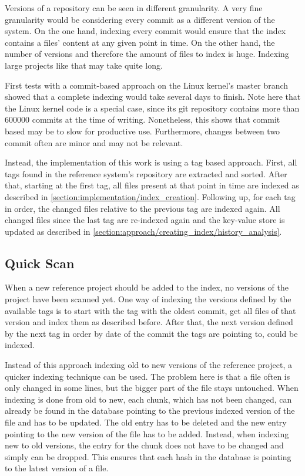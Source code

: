 Versions of a repository can be seen in different granularity.
A very fine granularity would be considering every commit as a different version of the system.
On the one hand, indexing every commit would ensure that the index contains a files' content at any given point in time.
On the other hand, the number of versions and therefore the amount of files to index is huge.
Indexing large projects like that may take quite long.

First tests with a commit-based approach on the Linux kernel's master branch showed that a complete indexing would take several days to finish.
Note here that the Linux kernel code is a special case, since its git repository contains more than 600000 commits at the time of writing.
Nonetheless, this shows that commit based may be to slow for productive use.
Furthermore, changes between two commit often are minor and may not be relevant.

Instead, the implementation of this work is using a tag based approach.
First, all tags found in the reference system's repository are extracted and sorted.
After that, starting at the first tag, all files present at that point in time are indexed as described in \autoref{section:implementation/index_creation}.
Following up, for each tag in order, the changed files relative to the previous tag are indexed again.
All changed files since the last tag are re-indexed again and the key-value store is updated as described in \autoref{section:approach/creating_index/history_analysis}.

\subsection{Quick Scan}\label{section:implementation/history_analysis/quick_scan}
When a new reference project should be added to the index, no versions of the project have been scanned yet.
One way of indexing the versions defined by the available tags is to start with the tag with the oldest commit, get all files of that version and index them as described before.
After that, the next version defined by the next tag in order by date of the commit the tags are pointing to, could be indexed.

Instead of this approach indexing old to new versions of the reference project, a quicker indexing technique can be used.
The problem here is that a file often is only changed in some lines, but the bigger part of the file stays untouched.
When indexing is done from old to new, each chunk, which has not been changed, can already be found in the database pointing to the previous indexed version of the file and has to be updated.
The old entry has to be deleted and the new entry pointing to the new version of the file has to be added.
Instead, when indexing new to old versions, the entry for the chunk does not have to be changed and simply can be dropped.
This ensures that each hash in the database is pointing to the latest version of a file.

